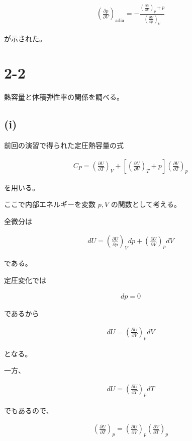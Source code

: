 \documentclass[platex,dvipdfmx,a4paper]{jsarticle}
\begin{document}
\begin{align*}
\left(\frac{\partial p}{\partial V}\right)_{\mathrm{adia}}
=
-
\frac{
\left(\frac{\partial U}{\partial V}\right)_p+p
}{
\left(\frac{\partial U}{\partial p}\right)_V
}
\end{align*}

が示された。
\section{2-2}

熱容量と体積弾性率の関係を調べる。

\subsection{(i)}

前回の演習で得られた定圧熱容量の式

\begin{align*}
C_P
=
\left(\frac{\partial U}{\partial T}\right)_V
+
\left[
\left(\frac{\partial U}{\partial V}\right)_T+p
\right]
\left(\frac{\partial V}{\partial T}\right)_p
\end{align*}

を用いる。

ここで内部エネルギーを変数 $p,V$ の関数として考える。

全微分は

\begin{align*}
dU
=
\left(\frac{\partial U}{\partial p}\right)_Vdp
+
\left(\frac{\partial U}{\partial V}\right)_pdV
\end{align*}

である。

定圧変化では

\begin{align*}
dp=0
\end{align*}

であるから

\begin{align*}
dU
=
\left(\frac{\partial U}{\partial V}\right)_p dV
\end{align*}

となる。

一方、

\begin{align*}
dU
=
\left(\frac{\partial U}{\partial T}\right)_p dT
\end{align*}

でもあるので、

\begin{align*}
\left(\frac{\partial U}{\partial T}\right)_p
=
\left(\frac{\partial U}{\partial V}\right)_p
\left(\frac{\partial V}{\partial T}\right)_p
\end{align*}
\end{document}
